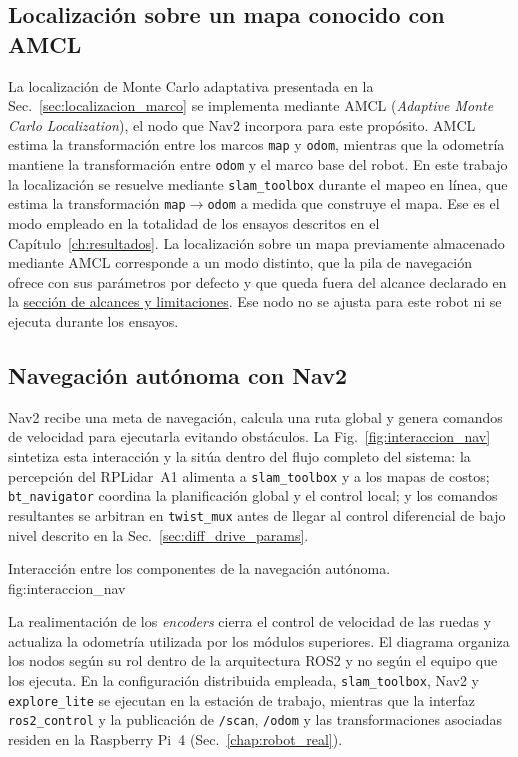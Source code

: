 \subsection{Localización sobre un mapa conocido con AMCL}
\label{sec:amcl_ch9}

La localización de Monte Carlo adaptativa presentada en la
Sec.~\ref{sec:localizacion_marco} se implementa mediante AMCL
(\textit{Adaptive Monte Carlo Localization}), el nodo que Nav2 incorpora para
este propósito. AMCL estima la transformación entre los marcos \texttt{map} y
\texttt{odom}, mientras que la odometría mantiene la transformación entre
\texttt{odom} y el marco base del robot.
En este trabajo la localización se resuelve mediante \texttt{slam\_toolbox}
durante el mapeo en línea, que estima la transformación
\texttt{map}$\rightarrow$\texttt{odom} a medida que construye el mapa. Ese es
el modo empleado en la totalidad de los ensayos descritos en el
Capítulo~\ref{ch:resultados}. La localización sobre un mapa previamente
almacenado mediante AMCL corresponde a un modo distinto, que la pila de
navegación ofrece con sus parámetros por defecto y que queda fuera del alcance
declarado en la \hyperref[sec:alcances]{sección de alcances y limitaciones}.
Ese nodo no se ajusta para este robot ni se ejecuta durante los ensayos.

\subsection{Navegación autónoma con Nav2}
\label{sec:nav2_ch9}

Nav2 recibe una meta de navegación, calcula una ruta global y genera comandos
de velocidad para ejecutarla evitando obstáculos. La
Fig.~\ref{fig:interaccion_nav} sintetiza esta interacción y la sitúa dentro
del flujo completo del sistema: la percepción del RPLidar~A1 alimenta a
\texttt{slam\_toolbox} y a los mapas de costos; \texttt{bt\_navigator}
coordina la planificación global y el control local; y los comandos
resultantes se arbitran en \texttt{twist\_mux} antes de llegar al control
diferencial de bajo nivel descrito en la Sec.~\ref{sec:diff_drive_params}.

{Interacción entre los componentes de la navegación autónoma.}
{fig:interaccion_nav}

La realimentación de los \textit{encoders} cierra el control de velocidad de las ruedas
y actualiza la odometría utilizada por los módulos superiores.
El diagrama organiza los nodos según su rol dentro de la arquitectura
\gls{ROS2} y no según el equipo que los ejecuta. En la configuración
distribuida empleada, \texttt{slam\_toolbox}, Nav2 y \texttt{explore\_lite}
se ejecutan en la estación de trabajo, mientras que la interfaz
\texttt{ros2\_control} y la publicación de \texttt{/scan}, \texttt{/odom} y
las transformaciones asociadas residen en la Raspberry Pi~4
(Sec.~\ref{chap:robot_real}).

